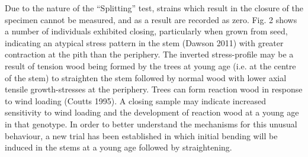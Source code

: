 Due to the nature of the “Splitting” test, strains which result in the closure of the specimen cannot be measured, and as a result are recorded as zero. Fig. 2 shows a number of individuals exhibited closing, particularly when grown from seed, indicating an atypical stress pattern in the stem (Dawson 2011) with greater contraction at the pith than the periphery. The inverted stress-profile may be a result of tension wood being formed by the trees at young age (i.e. at the centre of the stem) to straighten the stem followed by normal wood with lower axial tensile growth-stresses at the periphery. Trees can form reaction wood in response to wind loading (Coutts 1995). A closing sample may indicate increased sensitivity to wind loading and the development of reaction wood at a young age in that genotype. In order to better understand the mechanisms for this unusual behaviour, a new trial has been established in which initial bending will be induced in the stems at a young age followed by straightening.